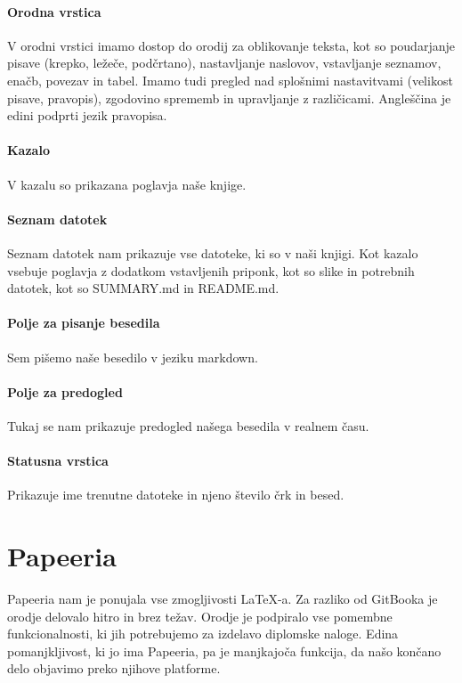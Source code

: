 \documentclass[a4paper, 12pt]{book}
\begin{document}
\paragraph{Orodna vrstica}
V orodni vrstici imamo dostop do orodij za oblikovanje teksta, kot so poudarjanje pisave (krepko, ležeče, podčrtano), nastavljanje naslovov, vstavljanje seznamov, enačb, povezav in tabel. Imamo tudi pregled nad splošnimi nastavitvami (velikost pisave, pravopis), zgodovino sprememb in upravljanje z različicami. Angleščina je edini podprti jezik pravopisa.

\paragraph{Kazalo}
V kazalu so prikazana poglavja naše knjige.

\paragraph{Seznam datotek}
Seznam datotek nam prikazuje vse datoteke, ki so v naši knjigi. Kot kazalo vsebuje poglavja z dodatkom vstavljenih priponk, kot so slike in potrebnih datotek, kot so SUMMARY.md in README.md.

\paragraph{Polje za pisanje besedila}
Sem pišemo naše besedilo v jeziku markdown.

\paragraph{Polje za predogled}
Tukaj se nam prikazuje predogled našega besedila v realnem času.

\paragraph{Statusna vrstica}
Prikazuje ime trenutne datoteke in njeno število črk in besed.


\section{Papeeria}
Papeeria nam je ponujala vse zmogljivosti {\LaTeX-a}. Za razliko od GitBooka je orodje delovalo hitro in brez težav. Orodje je podpiralo vse pomembne funkcionalnosti, ki jih potrebujemo za izdelavo diplomske naloge. Edina pomanjkljivost, ki jo ima Papeeria, pa je manjkajoča funkcija, da našo končano delo objavimo preko njihove platforme.
\end{document}
